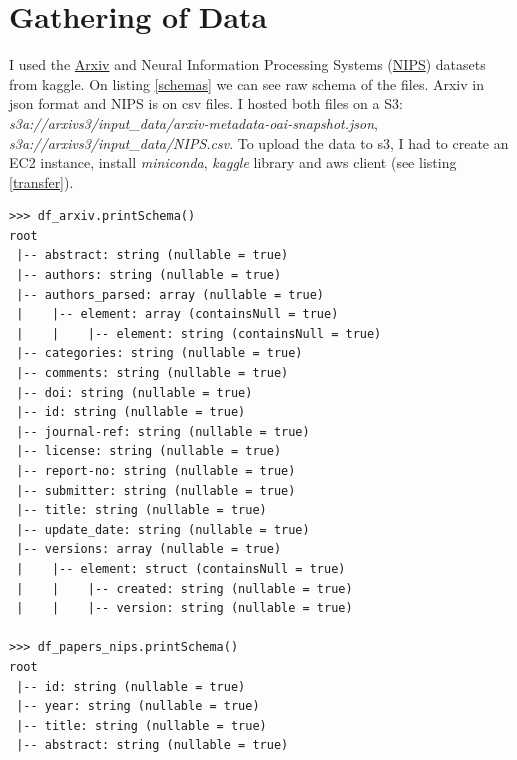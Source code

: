 \section{Gathering of Data}

I used the  \href{https://www.kaggle.com/Cornell-University/arxiv}{Arxiv} and Neural Information Processing 
    Systems (\href{https://www.kaggle.com/benhamner/nips-papers}{NIPS}) datasets from kaggle. On listing \ref{schemas}
we can see raw schema of the files. Arxiv in json format and NIPS is on csv files. I hosted both files on a S3: 
\emph{s3a://arxivs3/input\_data/arxiv-metadata-oai-snapshot.json}, \emph{s3a://arxivs3/input\_data/NIPS.csv}. To upload the
data to s3, I had to create an EC2 instance, install \emph{miniconda}, \emph{kaggle} library and aws client (see listing \ref{transfer}). 
   
\begin{mdframed}[backgroundcolor=light-gray, roundcorner=10pt,leftmargin=1, rightmargin=1, innerleftmargin=15, innertopmargin=15,innerbottommargin=15, outerlinewidth=1, linecolor=light-gray]
\begin{lstlisting}[caption={Datasets Schema},label={schemas}]    
>>> df_arxiv.printSchema()
root
 |-- abstract: string (nullable = true)
 |-- authors: string (nullable = true)
 |-- authors_parsed: array (nullable = true)
 |    |-- element: array (containsNull = true)
 |    |    |-- element: string (containsNull = true)
 |-- categories: string (nullable = true)
 |-- comments: string (nullable = true)
 |-- doi: string (nullable = true)
 |-- id: string (nullable = true)
 |-- journal-ref: string (nullable = true)
 |-- license: string (nullable = true)
 |-- report-no: string (nullable = true)
 |-- submitter: string (nullable = true)
 |-- title: string (nullable = true)
 |-- update_date: string (nullable = true)
 |-- versions: array (nullable = true)
 |    |-- element: struct (containsNull = true)
 |    |    |-- created: string (nullable = true)
 |    |    |-- version: string (nullable = true)
 
>>> df_papers_nips.printSchema()
root
 |-- id: string (nullable = true)
 |-- year: string (nullable = true)
 |-- title: string (nullable = true)
 |-- abstract: string (nullable = true)
\end{lstlisting}
\end{mdframed} 

